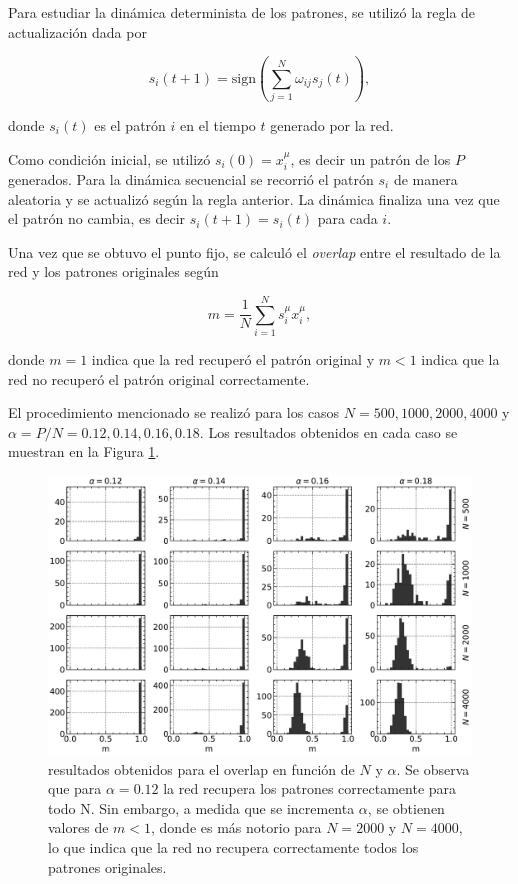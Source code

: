 \documentclass[11pt, twocolumn]{article}
\begin{document}
Para estudiar la dinámica determinista de los patrones, se utilizó la regla de actualización dada por

\begin{equation} \nonumber
    s_i(t+1) = \text{sign} \left( \sum_{j=1}^{N} \omega_{ij} s_j(t) \right),
\end{equation}

\noindent donde \(s_i(t)\) es el patrón \(i\) en el tiempo \(t\) generado por la red. 

Como condición inicial, se utilizó \(s_i(0) = x_i^\mu\), es decir un patrón de los \(P\) generados. Para la dinámica secuencial se recorrió el patrón \(s_i\) de manera aleatoria y se actualizó según la regla anterior. La dinámica finaliza una vez que el patrón no cambia, es decir \(s_i(t+1) = s_i(t)\) para cada \(i\). 

Una vez que se obtuvo el punto fijo, se calculó el \textit{overlap} entre el resultado de la red y los patrones originales según 

\begin{equation} \nonumber
    m = \frac{1}{N} \sum_{i=1}^{N} s_i^\mu x_i^\mu,
\end{equation}

\noindent donde \(m = 1\) indica que la red recuperó el patrón original y \(m < 1\) indica que la red no recuperó el patrón original correctamente.

El procedimiento mencionado se realizó para los casos \(N = 500, 1000, 2000, 4000\) y \(\alpha = P/N = 0.12, 0.14, 0.16, 0.18\). Los resultados obtenidos en cada caso se muestran en la Figura \ref{fig:ej1}.

\begin{figure} [t]
    \centering
    \includegraphics[width=\textwidth]{figures/overlap_histograms.pdf}
    \caption{resultados obtenidos para el overlap en función de \(N\) y \(\alpha\). Se observa que para \(\alpha = 0.12\) la red recupera los patrones correctamente para todo N. Sin embargo, a medida que se incrementa \(\alpha\), se obtienen valores de \(m < 1\), donde es más notorio para \(N = 2000\) y \(N = 4000\), lo que indica que la red no recupera correctamente todos los patrones originales.}
    \label{fig:ej1}
\end{figure}
\end{document}
